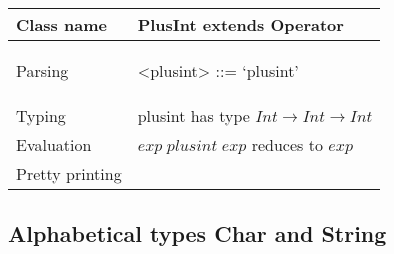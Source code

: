\documentclass[12pt]{article}
\begin{document}
\begin{tabular}{|l|p{15cm}|}
\hline
Class name & PlusInt extends Operator \\
\hline
Parsing & 
\begin{grammar}
<plusint> ::=  `plusint'
\end{grammar}  \\
\hline
Typing &  plusint has type  $Int \rightarrow Int \rightarrow Int$
\\
\hline
Evaluation &  $exp \; plusint \; exp$ reduces to $exp$\\
\hline
Pretty printing & \\
\hline
\end{tabular} 


\subsection{Alphabetical types Char and String}
\end{document}
